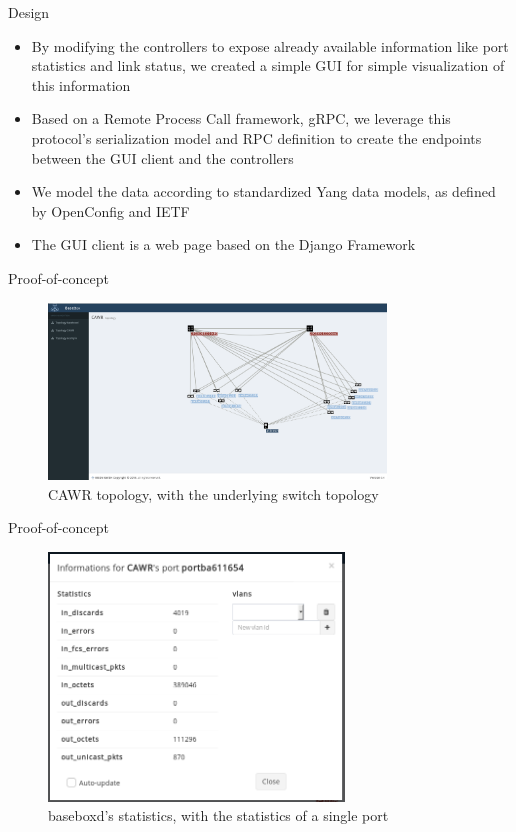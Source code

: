 \documentclass[aspectratio=43]{beamer}
\begin{document}
\begin{frame}{Design}
    \begin{itemize}
        \item By modifying the controllers to expose already available information like port statistics
            and link status, we created a simple GUI for simple visualization of this information

        \item Based on a Remote Process Call framework, gRPC, we leverage this protocol's serialization model
            and RPC definition to create the endpoints between the GUI client and the controllers

        \item We model the data according to standardized Yang data models, as defined by OpenConfig and IETF

        \item The GUI client is a web page based on the Django Framework
    \end{itemize}
\end{frame}

\begin{frame}{Proof-of-concept}
    \begin{figure}[!tbph]
      \centering
      \includegraphics[width=0.8\textwidth]{bisdn/cawr_gui}
      \caption {CAWR topology, with the underlying switch topology}
    \end{figure}
\end{frame}

\begin{frame}{Proof-of-concept}
    \begin{figure}[!tbph]
      \centering
      \includegraphics[width=0.7\textwidth]{bisdn/basebox_gui}
      \caption {baseboxd's statistics, with the statistics of a single port}
    \end{figure}
\end{frame}
\end{document}
